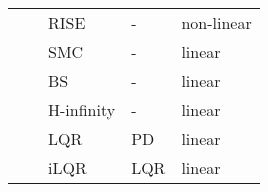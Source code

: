 \begin{landscape}
\begin{tiny}
\begin{table}[!htbp]
\begin{tabularx}{\linewidth}{@{}lllll@{}}
        \citet{Yang2018}             & \citeyear{Yang2018}             & RISE                                                                   & -                                                                      & non-linear           \\
        \citet{Martinez-Vasquez2020} & \citeyear{Martinez-Vasquez2020} & SMC                                                                    & -                                                                      & linear               \\
        \citet{Mosco-Luciano2020}    & \citeyear{Mosco-Luciano2020}    & BS                                                                     & -                                                                      & linear               \\
        \citet{Rigatos2018}          & \citeyear{Rigatos2018}          & H-infinity                                                             & -                                                                      & linear               \\
        \citet{Alothman2015}         & \citeyear{Alothman2015}         & LQR                                                                    & PD                                                                     & linear               \\
        \citet{Alothman2016}         & \citeyear{Alothman2016}         & iLQR                                                                   & LQR                                                                    & linear               \\
        \bottomrule
    \end{tabularx}
    \label{tbl:lit}
\end{table}


    \end{tiny}
\end{landscape}